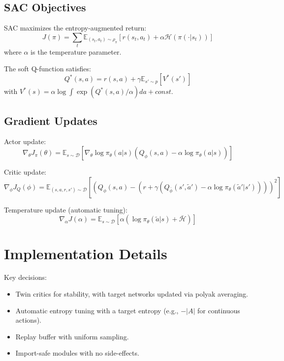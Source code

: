 \documentclass[11pt,a4paper]{article}
\begin{document}
\subsection{SAC Objectives}
SAC maximizes the entropy-augmented return:
\begin{equation}
J(\pi) = \sum_t \mathbb{E}_{(s_t,a_t)\sim\rho_\pi} [r(s_t,a_t) + \alpha \mathcal{H}(\pi(\cdot|s_t))]
\end{equation}
where $\alpha$ is the temperature parameter.

The soft Q-function satisfies:
\begin{equation}
Q^*(s,a) = r(s,a) + \gamma \mathbb{E}_{s'\sim p} [V^*(s')]
\end{equation}
with $V^*(s) = \alpha \log \int \exp(Q^*(s,a)/\alpha) da + const$.

\subsection{Gradient Updates}
Actor update:
\begin{equation}
\nabla_\theta J_\pi(\theta) = \mathbb{E}_{s\sim\mathcal{D}} [\nabla_\theta \log\pi_\theta(a|s) (Q_\phi(s,a) - \alpha \log\pi_\theta(a|s))]
\end{equation}

Critic update:
\begin{equation}
\nabla_\phi J_Q(\phi) = \mathbb{E}_{(s,a,r,s')\sim\mathcal{D}} [(Q_\phi(s,a) - (r + \gamma (Q_{\bar\phi}(s',\tilde a') - \alpha \log\pi_\theta(\tilde a'|s'))))^2]
\end{equation}

Temperature update (automatic tuning):
\begin{equation}
\nabla_\alpha J(\alpha) = \mathbb{E}_{s\sim\mathcal{D}} [\alpha (\log\pi_\theta(\tilde a|s) + \bar{\mathcal{H}})]
\end{equation}

\section{Implementation Details}
Key decisions:
\begin{itemize}
  \item Twin critics for stability, with target networks updated via polyak averaging.
  \item Automatic entropy tuning with a target entropy (e.g., $-|A|$ for continuous actions).
  \item Replay buffer with uniform sampling.
  \item Import-safe modules with no side-effects.
\end{itemize}
\end{document}
